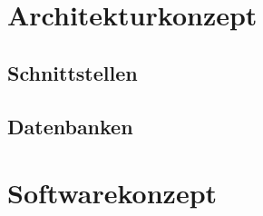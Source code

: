 

\section{Architekturkonzept}
\label{sec:architekturkonzept}
    
    \subsection{Schnittstellen}
    
    \subsection{Datenbanken}

\section{Softwarekonzept}
\label{sec:softwarekonzept}



